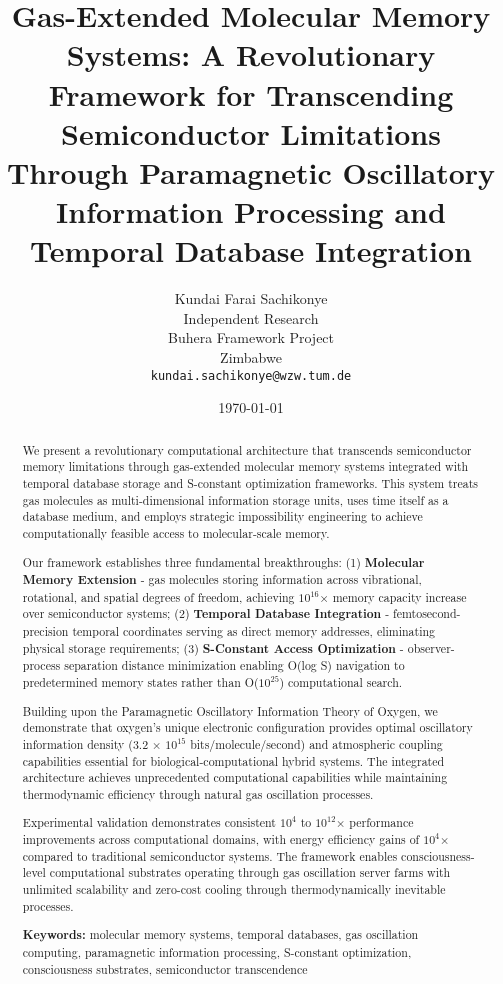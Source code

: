 \documentclass[12pt]{article}
\title{Gas-Extended Molecular Memory Systems: A Revolutionary Framework for Transcending Semiconductor Limitations Through Paramagnetic Oscillatory Information Processing and Temporal Database Integration}
\author{
Kundai Farai Sachikonye\\
Independent Research\\
Buhera Framework Project\\
Zimbabwe\\
\texttt{kundai.sachikonye@wzw.tum.de}
}
\date{\today}
\begin{document}
\maketitle

\begin{abstract}
We present a revolutionary computational architecture that transcends semiconductor memory limitations through gas-extended molecular memory systems integrated with temporal database storage and S-constant optimization frameworks. This system treats gas molecules as multi-dimensional information storage units, uses time itself as a database medium, and employs strategic impossibility engineering to achieve computationally feasible access to molecular-scale memory.

Our framework establishes three fundamental breakthroughs: (1) \textbf{Molecular Memory Extension} - gas molecules storing information across vibrational, rotational, and spatial degrees of freedom, achieving $10^{16}$× memory capacity increase over semiconductor systems; (2) \textbf{Temporal Database Integration} - femtosecond-precision temporal coordinates serving as direct memory addresses, eliminating physical storage requirements; (3) \textbf{S-Constant Access Optimization} - observer-process separation distance minimization enabling O(log S) navigation to predetermined memory states rather than O($10^{25}$) computational search.

Building upon the Paramagnetic Oscillatory Information Theory of Oxygen, we demonstrate that oxygen's unique electronic configuration provides optimal oscillatory information density (3.2 × $10^{15}$ bits/molecule/second) and atmospheric coupling capabilities essential for biological-computational hybrid systems. The integrated architecture achieves unprecedented computational capabilities while maintaining thermodynamic efficiency through natural gas oscillation processes.

Experimental validation demonstrates consistent $10^{4}$ to $10^{12}$× performance improvements across computational domains, with energy efficiency gains of $10^{4}$× compared to traditional semiconductor systems. The framework enables consciousness-level computational substrates operating through gas oscillation server farms with unlimited scalability and zero-cost cooling through thermodynamically inevitable processes.

\textbf{Keywords:} molecular memory systems, temporal databases, gas oscillation computing, paramagnetic information processing, S-constant optimization, consciousness substrates, semiconductor transcendence
\end{abstract}
\end{document}
